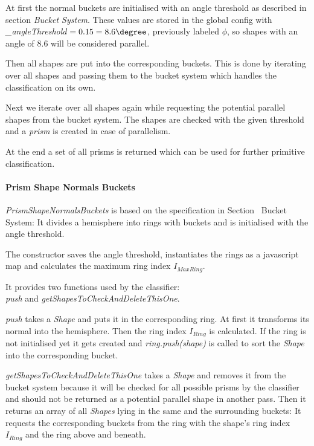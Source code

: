 \documentclass[../ClassicThesis.tex]{subfiles}
\begin{document}
At first the normal buckets are initialised with an angle threshold as described in section \emph{Bucket System}. These values are stored in the global config with \emph{\_angleThreshold} $ = 0.15 = 8.6\degree $, previously labeled $\phi$, so shapes with an angle  of 8.6\textdegree \hspace{1pt} will be considered parallel.

Then all shapes are put into the corresponding buckets. This is done by iterating over all shapes and passing them to the bucket system which handles the classification on its own.

Next we iterate over all shapes again while requesting the potential parallel shapes from the bucket system. The shapes are checked with the given threshold and a \emph{prism} is created in case of parallelism.

At the end a set of all prisms is returned which can be used for further primitive classification.


\paragraph{Prism Shape Normals Buckets}

\emph{PrismShapeNormalsBuckets} is based on the specification in Section~ Bucket System: It divides a hemisphere into rings with buckets and is initialised with the angle threshold.

The constructor saves the angle threshold, instantiates the rings as a javascript map and calculates the maximum ring index $I_{MaxRing}$.

It provides two functions used by the classifier: \\
\emph{push} and \emph{getShapesToCheckAndDeleteThisOne}.

\emph{push} takes a \emph{Shape} and puts it in the corresponding ring. At first it transforms its normal into the hemisphere. Then the ring index $ I_{Ring} $ is calculated. If the ring is not initialised yet it gets created and \emph{ring.push(shape)} is called to sort the \emph{Shape} into the corresponding bucket.

\emph{getShapesToCheckAndDeleteThisOne} takes a \emph{Shape} and removes it from the bucket system because it will be checked for all possible prisms by the classifier and should not be returned as a potential parallel shape in another pass. Then it returns an array of all \emph{Shapes} lying in the same and the surrounding buckets: It requests the corresponding buckets from the ring with the shape's ring index $ I_{Ring} $ and the ring above and beneath.
\end{document}
